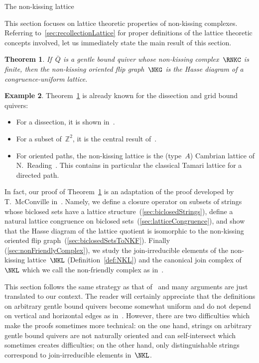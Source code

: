 \documentclass{amsart}
\makeatletter
\newtheorem{theorem}{Theorem}[part]
\theoremstyle{definition}
\newtheorem{example}[theorem]{Example}
\newcommand{\Z}{\mathbb{Z}} %
\def\part{\@startsection{part}{1}%
\z@{.7\linespacing\@plus\linespacing}{.8\linespacing}%
{\LARGE\sffamily\centering}}
\makeatother
\begin{document}

\clearpage
\part{The non-kissing lattice}
\label{part:lattice}

This section focuses on lattice theoretic properties of non-kissing complexes.
Referring to~\ref{sec:recollectionLattice} for proper definitions of the lattice theoretic concepts involved, let us immediately state the main result of this section.

\begin{theorem}
\label{thm:lattice}
If~$\bar Q$ is a gentle bound quiver whose non-kissing complex~$\RNKC$ is finite, then the non-kissing oriented flip graph~$\NKG$ is the Hasse diagram of a congruence-uniform lattice.
\end{theorem}

\begin{example}
Theorem~\ref{thm:lattice} is already known for the dissection and grid bound quivers:
\begin{itemize}
\item For a dissection, it is shown in~\cite{GarverMcConville}.
\item For a subset of~$\Z^2$,  it is the central result of~\cite{McConville}.
\item For oriented paths, the non-kissing lattice is the (type~$A$) Cambrian lattice of N.~Reading~\cite{Reading-CambrianLattices}. This contains in particular the classical Tamari lattice for a directed path.
\end{itemize}
\end{example}

In fact, our proof of Theorem~\ref{thm:lattice} is an adaptation of the proof  developed by T.~McConville in~\cite{McConville}.
Namely, we define a closure operator on subsets of strings whose biclosed sets have a lattice structure~(\ref{sec:biclosedStrings}), define a natural lattice congruence on biclosed sets~(\ref{sec:latticeCongruence}), and show that the Hasse diagram of the lattice quotient is isomorphic to the non-kissing oriented flip graph~(\ref{sec:biclosedSetsToNKF}).
Finally (\ref{sec:nonFriendlyComplex}), we study the join-irreducible elements of the non-kissing lattice~$\NKL$ (Definition~\ref{def:NKL}) and the canonical join complex of~$\NKL$ which we call the non-friendly complex as in~\cite{GarverMcConville-grid}.

This section follows the same strategy as that of~\cite{McConville, GarverMcConville-grid} and many arguments are just translated to our context.
The reader will certainly appreciate that the definitions on arbitrary gentle bound quivers become somewhat uniform and do not depend on vertical and horizontal edges as in~\cite{McConville}.
However, there are two difficulties which make the proofs sometimes more technical: on the one hand, strings on arbitrary gentle bound quivers are not naturally oriented and can self-intersect which sometimes creates difficulties; on the other hand, only distinguishable strings correspond to join-irreducible elements in~$\NKL$.
\end{document}
